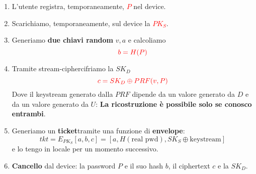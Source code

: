 \begin{definition}\label{def:devinit}
    \begin{enumerate}
        \item L'utente registra, temporaneamente, \textcolor{red}{$P$} nel device. 
        \item Scarichiamo, temporaneamente, sul device la \textcolor{red}{$PK_S$}.
        \item Generiamo \textbf{due chiavi random} $v,a$ e calcoliamo
        \[\textcolor{red}{b=H(P)}\]
        \item Tramite stream-cipher\footnotemark cifriamo la $SK_D$
        \[\textcolor{red}{c=SK_D\oplus PRF(v,P)}\]
        Dove il keystream generato dalla $PRF$ dipende da un valore generato da $D$ e da un valore generato da $U$: \textbf{La ricostruzione è possibile solo se conosco entrambi}\footnotemark.
        \item Generiamo un \textbf{ticket}\footnotemark tramite una funzione di \textbf{envelope}:
        \[tkt=E_{PK_S}[a,b,c]=[a, H(\text{real pwd}), SK_S\oplus \text{keystream}]\]
        e lo tengo in locale per un momento successivo.
        \item \textbf{Cancello} dal device: la password $P$ e il suo hash $b$, il ciphertext $c$ e la $SK_D$.
    \end{enumerate}
\end{definition}
